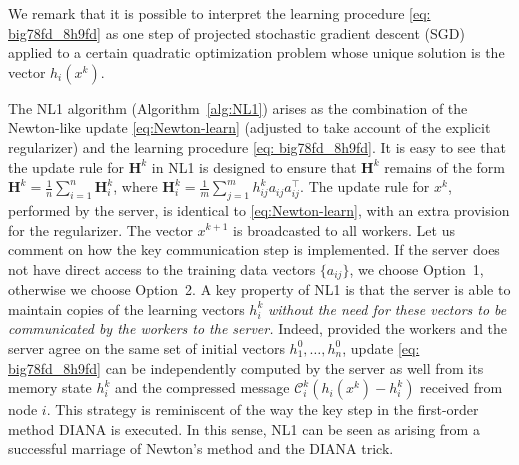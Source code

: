 \documentclass[12pt]{article}
\newcommand{\newalpha}{h}
\newcommand{\mH}{\mathbf{H}}
\newcommand{\cC}{{\mathcal{C}}}
\begin{document}
We remark that it is possible to interpret the learning procedure \eqref{eq: big78fd_8h9fd}  as one step of projected stochastic gradient descent (SGD)  applied to a certain quadratic optimization problem whose unique solution is the vector $\newalpha_i(x^k)$. 



The {\sf NL1} algorithm (Algorithm~\ref{alg:NL1}) arises as the combination of the Newton-like update \eqref{eq:Newton-learn} (adjusted to take account of the explicit regularizer) and the learning procedure \eqref{eq: big78fd_8h9fd}. It is easy to see that the update rule for $\mH^k$ in {\sf NL1} is designed to ensure that $\mH^k$ remains of the form  $\mH^k = \frac{1}{n}\sum_{i=1}^n \mH^k_i$, where $\mH^k_i = \frac{1}{m} \sum_{j=1}^{m} h^k_{ij} a_{ij}a_{ij}^\top$. The update rule for $x^k$, performed by the server, is identical to \eqref{eq:Newton-learn},  with an extra provision for the regularizer. The vector $x^{k+1}$ is broadcasted to all workers. Let us comment on how the key communication step is implemented. If the server does not have direct access to the training data vectors $\{a_{ij} \}$, we choose Option~1, otherwise we choose Option~2. A key property of {\sf NL1} is that the server is able to maintain  copies of the learning vectors $h_i^k$ {\em without the need for these vectors to be communicated by the workers to the server.} Indeed, provided the workers and the server agree on the same set of initial vectors $h_1^0, \dots, h_n^0$, update \eqref{eq: big78fd_8h9fd} can be independently computed by  the server as well from its memory state $h_i^k$ and the compressed message $\cC_i^k (\newalpha_i(x^k) - h^k_i)$ received from node $i$. This strategy is reminiscent of the way the key step in the first-order method DIANA \citep{DIANA, DIANA2} is executed. In this sense, {\sf NL1} can be seen as arising from a successful marriage of Newton's method and the DIANA trick.
\end{document}
